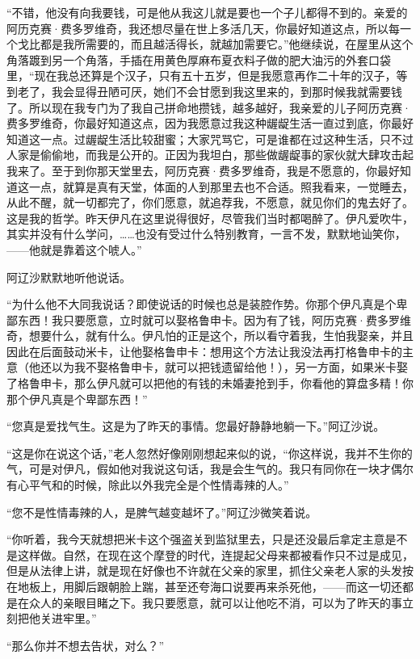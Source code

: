 \par “不错，他没有向我要钱，可是他从我这儿就是要也一个子儿都得不到的。亲爱的阿历克赛·费多罗维奇，我还想尽量在世上多活几天，你最好知道这点，所以每一个戈比都是我所需要的，而且越活得长，就越加需要它。”他继续说，在屋里从这个角落踱到另一个角落，手插在用黄色厚麻布夏衣料子做的肥大油污的外套口袋里，“现在我总还算是个汉子，只有五十五岁，但是我愿意再作二十年的汉子，等到老了，我会显得丑陋可厌，她们不会甘愿到我这里来的，到那时候我就需要钱了。所以现在我专门为了我自己拼命地攒钱，越多越好，我亲爱的儿子阿历克赛·费多罗维奇，你最好知道这点，因为我愿意过我这种龌龊生活一直过到底，你最好知道这一点。过龌龊生活比较甜蜜；大家咒骂它，可是谁都在过这种生活，只不过人家是偷偷地，而我是公开的。正因为我坦白，那些做龌龊事的家伙就大肆攻击起我来了。至于到你那天堂里去，阿历克赛·费多罗维奇，我是不愿意的，你最好知道这一点，就算是真有天堂，体面的人到那里去也不合适。照我看来，一觉睡去，从此不醒，就一切都完了，你们愿意，就追荐我，不愿意，就见你们的鬼去好了。这是我的哲学。昨天伊凡在这里说得很好，尽管我们当时都喝醉了。伊凡爱吹牛，其实并没有什么学问，……也没有受过什么特别教育，一言不发，默默地讪笑你，——他就是靠着这个唬人。”
\par 阿辽沙默默地听他说话。
\par “为什么他不大同我说话？即使说话的时候也总是装腔作势。你那个伊凡真是个卑鄙东西！我只要愿意，立时就可以娶格鲁申卡。因为有了钱，阿历克赛·费多罗维奇，想要什么，就有什么。伊凡怕的正是这个，所以看守着我，生怕我娶亲，并且因此在后面鼓动米卡，让他娶格鲁申卡：想用这个方法让我没法再打格鲁申卡的主意（他还以为我不娶格鲁申卡，就可以把钱遗留给他！），另一方面，如果米卡娶了格鲁申卡，那么伊凡就可以把他的有钱的未婚妻抢到手，你看他的算盘多精！你那个伊凡真是个卑鄙东西！”
\par “您真是爱找气生。这是为了昨天的事情。您最好静静地躺一下。”阿辽沙说。
\par “这是你在说这个话，”老人忽然好像刚刚想起来似的说，“你这样说，我并不生你的气，可是对伊凡，假如他对我说这句话，我是会生气的。我只有同你在一块才偶尔有心平气和的时候，除此以外我完全是个性情毒辣的人。”
\par “您不是性情毒辣的人，是脾气越变越坏了。”阿辽沙微笑着说。
\par “你听着，我今天就想把米卡这个强盗关到监狱里去，只是还没最后拿定主意是不是这样做。自然，在现在这个摩登的时代，连提起父母来都被看作只不过是成见，但是从法律上讲，就是现在好像也不许就在父亲的家里，抓住父亲老人家的头发按在地板上，用脚后跟朝脸上踹，甚至还夸海口说要再来杀死他，——而这一切还都是在众人的亲眼目睹之下。我只要愿意，就可以让他吃不消，可以为了昨天的事立刻把他关进牢里。”
\par “那么你并不想去告状，对么？”

